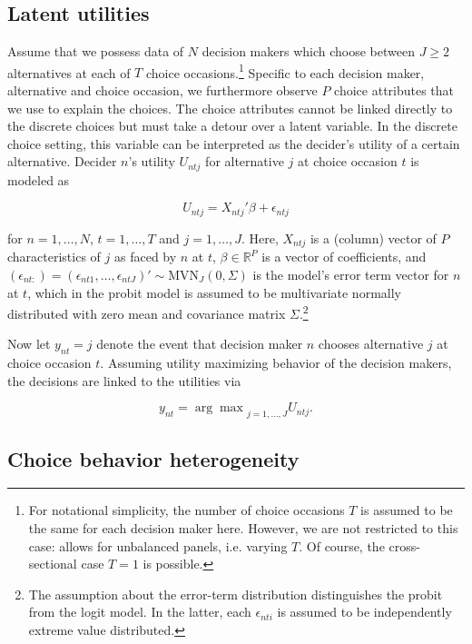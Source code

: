 \documentclass[article]{jss}
\begin{document}
\subsection{Latent utilities} \label{subsec:latent_utilities}

Assume that we possess data of $N$ decision makers which choose between $J \geq 2$ alternatives at each of $T$ choice occasions.\footnote{For notational simplicity, the number of choice occasions $T$ is assumed to be the same for each decision maker here. However, we are not restricted to this case:  allows for unbalanced panels, i.e. varying $T$. Of course, the cross-sectional case $T = 1$ is possible.} Specific to each decision maker, alternative and choice occasion, we furthermore observe $P$ choice attributes that we use to explain the choices. The choice attributes cannot be linked directly to the discrete choices but must take a detour over a latent variable. In the discrete choice setting, this variable can be interpreted as the decider's utility of a certain alternative. Decider $n$'s utility $U_{ntj}$ for alternative $j$ at choice occasion $t$ is modeled as

\begin{equation}
  \label{eqn:utility}
  U_{ntj} = X_{ntj}'\beta + \epsilon_{ntj}
\end{equation}

for $n=1,\dots,N$, $t=1,\dots,T$ and $j=1,\dots,J$. Here, $X_{ntj}$ is a (column) vector of $P$ characteristics of $j$ as faced by $n$ at $t$, $\beta \in {\mathbb R}^{P}$ is a vector of coefficients, and $(\epsilon_{nt:}) = (\epsilon_{nt1},\dots,\epsilon_{ntJ})' \sim \text{MVN}_{J} (0,\Sigma)$ is the model's error term vector for $n$ at $t$, which in the probit model is assumed to be multivariate normally distributed with zero mean and covariance matrix $\Sigma$.\footnote{The assumption about the error-term distribution distinguishes the probit from the logit model. In the latter, each $\epsilon_{nti}$ is assumed to be independently extreme value distributed.}

Now let $y_{nt}=j$ denote the event that decision maker $n$ chooses alternative $j$ at choice occasion $t$. Assuming utility maximizing behavior of the decision makers, the decisions are linked to the utilities via

\begin{equation}
y_{nt} = {\arg \max}_{j = 1,\dots,J} U_{ntj}.
\end{equation}

\subsection{Choice behavior heterogeneity} \label{subsec:heterogeneity}
\end{document}
